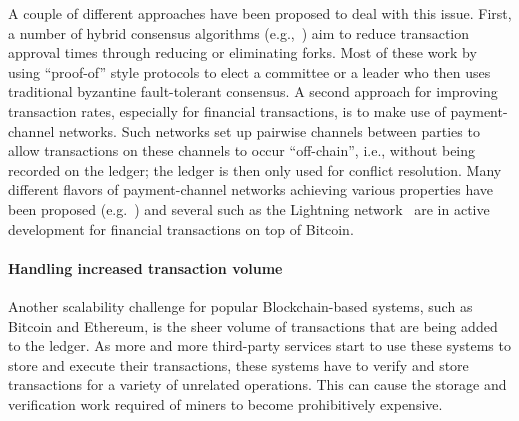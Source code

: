 A couple of different approaches have been proposed to deal with this issue.  First, a number of hybrid consensus algorithms (e.g.,~\cite{SOSP:GHMVZ17,OPODIS:AMNRS17,DISC:PasShi17,EC:PasShi18,NSDI:EGSR16}) aim to reduce transaction approval times through reducing or eliminating forks. Most of these work by using ``proof-of'' style protocols to elect a committee or a leader who then uses traditional byzantine fault-tolerant consensus. A second approach for improving transaction rates, especially for financial transactions, is to make use of payment-channel networks. Such networks set up pairwise channels between parties to allow transactions on these channels to occur ``off-chain'', i.e., without being recorded on the ledger; the ledger is then only used for conflict resolution.  Many different flavors of payment-channel networks achieving various properties have been proposed (e.g.~\cite{PooDry16, NDSS:HABSG17,CCS:KhaGer17,SYSTOR:LNEKPS18,CCS:MMKMR17,CCS:GreMie17}) and several such as the Lightning network~\cite{PooDry16} are in active development for financial transactions on top of Bitcoin.  

\paragraph{Handling increased transaction volume}
Another scalability challenge for popular Blockchain-based systems, such as Bitcoin and Ethereum, is the sheer volume of transactions that are being added to the ledger.  As more and more third-party services start to use these systems to store and execute their transactions, these systems have to verify and store transactions for a variety of unrelated operations. This can cause the storage and verification work required of miners to become prohibitively expensive.

